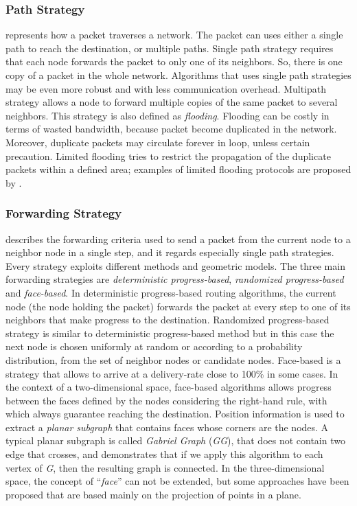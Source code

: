 \documentclass[journal,comsoc]{IEEEtran}
\begin{document}
\subsubsection{Path Strategy} represents how a packet traverses a network. The packet can uses either a single path to reach the destination, or multiple paths. 
Single path strategy requires that each node forwards the packet to only one of its neighbors. So, there is one copy of a packet in the whole network. Algorithms that uses single path strategies may be even more robust and with less communication overhead.
Multipath strategy allows a node to forward multiple copies of the same packet to several neighbors. This strategy is also defined as \textit{flooding}. Flooding can be costly in terms of wasted bandwidth, because packet become duplicated in the network. Moreover, duplicate packets may circulate forever in loop, unless certain precaution. Limited flooding tries to restrict the propagation of the duplicate packets within a defined area; examples of limited flooding protocols are proposed by \cite{basagni:dream, ko:lar}.
\subsubsection{Forwarding Strategy} describes the forwarding criteria used to send a packet from the current node to a neighbor node in a single step, and it regards especially single path strategies. Every strategy exploits different methods and geometric models. The three main forwarding strategies are \textit{deterministic progress-based}, \textit{randomized progress-based} and \textit{face-based}.
In deterministic progress-based routing algorithms, the current node (the node holding the packet) forwards the packet at every step to one of its neighbors that make progress to the destination.
Randomized progress-based strategy is similar to deterministic progress-based method but in this case the next node is chosen uniformly at random or according to a probability distribution, from the set of neighbor nodes or candidate nodes.
Face-based is a strategy that allows to arrive at a delivery-rate close to 100\% in some cases. In the context of a two-dimensional space, face-based algorithms allows progress between the faces defined by the nodes considering the right-hand rule, with which always guarantee reaching the destination. Position information is used to extract a \emph{planar subgraph} that contains faces whose corners are the nodes. A typical planar subgraph is called \emph{Gabriel Graph} (\emph{GG}), that does not contain two edge that crosses, and \cite{gabriel:gg} demonstrates that if we apply this algorithm to each vertex of \emph{G}, then the resulting graph is connected. In the three-dimensional space, the concept of ``\emph{face}'' can not be extended, but some approaches have been proposed that are based mainly on the projection of points in a plane.
\end{document}
